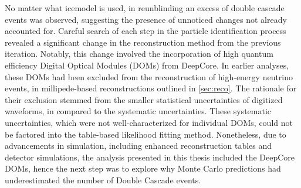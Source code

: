 No matter what icemodel is used, in reunblinding an excess of double cascade events was observed, suggesting the presence of unnoticed changes not already accounted for. Careful search of each step in the particle identification process revealed a significant change in the reconstruction method from the previous iteration. Notably, this change involved the incorporation of high quantum efficiency Digital Optical Modules (DOMs) from DeepCore. In earlier analyses, these DOMs had been excluded from the reconstruction of high-energy neutrino events, in millipede-based reconstructions outlined in \ref{sec:reco}. The rationale for their exclusion stemmed from the smaller statistical uncertainties of digitized waveforms, in compared to the systematic uncertainties. These systematic uncertainties, which were not well-characterized for individual DOMs, could not be factored into the table-based likelihood fitting method. Nonetheless, due to advancements in simulation, including enhanced reconstruction tables and detector simulations, the analysis presented in this thesis included the DeepCore DOMs, hence the next step was to explore why Monte Carlo predictions had underestimated the number of Double Cascade events. 

